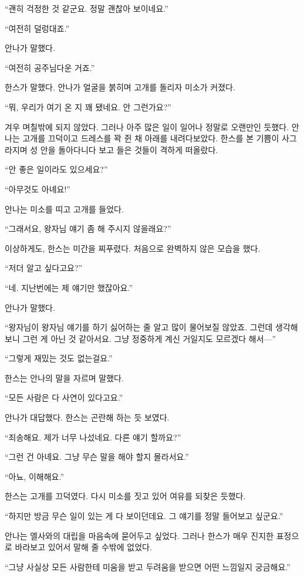 ``괜히 걱정한 것 같군요. 정말 괜찮아 보이네요.''

``여전히 덜렁대죠.''

안나가 말했다.

``여전히 공주님다운 거죠.''

한스가 말했다. 안나가 얼굴을 붉히며 고개를 돌리자 미소가 커졌다.

``뭐, 우리가 여기 온 지 꽤 됐네요. 안 그런가요?''

겨우 며칠밖에 되지 않았다. 그러나 아주 많은 일이 일어나 정말로 오랜만인 듯했다. 안나는 고개를 끄덕이고 드레스를 꽉 쥔 채 아래를 내려다보았다. 한스를 본 기쁨이 사그라지며 성 안을 돌아다니다 보고 들은 것들이 격하게 떠올랐다.

``안 좋은 일이라도 있으세요?''

``아무것도 아녜요!''

안나는 미소를 띠고 고개를 들었다.

``그래서요, 왕자님 얘기 좀 해 주시지 않을래요?''

이상하게도, 한스는 미간을 찌푸렸다. 처음으로 완벽하지 않은 모습을 했다.

``저 더 알고 싶다고요?''

``네. 지난번에는 제 얘기만 했잖아요.''

안나가 말했다.

``왕자님이 왕자님 얘기를 하기 싫어하는 줄 알고 많이 물어보질 않았죠. 그런데 생각해보니 그런 게 아닌 것 같아서요. 그냥 정중하게 계신 거일지도 모르겠다 해서—''

``그렇게 재밌는 것도 없는걸요.''

한스는 안나의 말을 자르며 말했다.

``모든 사람은 다 사연이 있다고요.''

안나가 대답했다. 한스는 곤란해 하는 듯 보였다.

``죄송해요. 제가 너무 나섰네요. 다른 얘기 할까요?''

``그런 건 아녜요. 그냥 무슨 말을 해야 할지 몰라서요.''

``아뇨, 이해해요.''

한스는 고개를 끄덕였다. 다시 미소를 짓고 있어 여유를 되찾은 듯했다.

``하지만 방금 무슨 일이 있는 게 다 보이던데요. 그 얘기를 정말 들어보고 싶군요.''

안나는 엘사와의 대립을 마음속에 묻어두고 싶었다. 그러나 한스가 매우 진지한 표정으로 바라보고 있어서 말해 줄 수밖에 없었다.

``그냥 사실상 모든 사람한테 미움을 받고 두려움을 받으면 어떤 느낌일지 궁금해요.''

